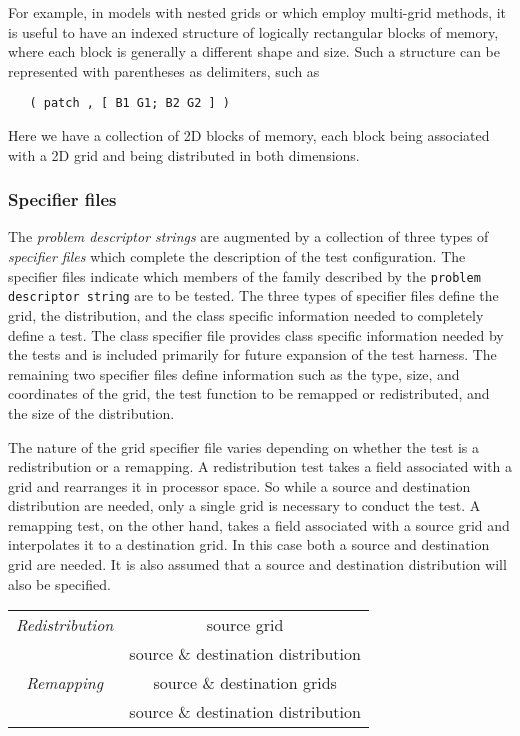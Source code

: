 For example, in models with nested grids or which employ multi-grid methods, it is useful to have an indexed structure of  logically rectangular blocks of memory, where each block is generally a different shape and size. Such a structure can be represented with parentheses as delimiters, such as
\begin{center}
\begin{verbatim}
   ( patch , [ B1 G1; B2 G2 ] )
\end{verbatim}
\end{center}
Here we have a collection of 2D blocks of memory, each block being associated with a 2D grid and being distributed in both dimensions.

\subsubsection{Specifier files}
The \textit{problem descriptor strings} are augmented by a collection of three types of \textit{specifier files} which complete the description of the test configuration. The specifier files indicate which members of the family described by the \texttt{problem descriptor string} are to be tested. The three types of specifier files define the grid, the distribution, and the class specific information needed to completely define a test. The class specifier file provides class specific information needed by the tests and is included primarily for future expansion of the test harness. The remaining two specifier files define information such as the type, size, and coordinates of the grid, the test function to be remapped or redistributed, and the size of the distribution.  

The nature of the grid specifier file varies depending on whether the test is a redistribution or a remapping. A redistribution test takes a field associated with a grid and rearranges it in processor space. So while a source and destination distribution are needed, only a single grid is necessary to conduct the test. A remapping test, on the other hand, takes a field associated with a source grid and interpolates it to a destination grid. In this case both a source and destination grid are needed. It is also assumed that a source and destination distribution will also be specified.
\begin{center}
\begin{tabular}{| c | c |} \hline 
{\em Redistribution} &  source grid  \\
 & source \& destination distribution \\
\hline \hline
 {\em Remapping}  & source \& destination grids  \\
 &  source \& destination distribution \\
\hline
\end{tabular}
\end{center}


